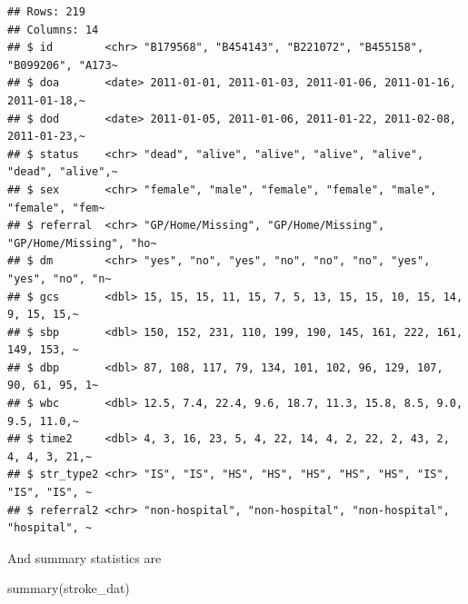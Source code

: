 \documentclass[
]{book}
\makeatletter
\newenvironment{Shaded}{\begin{snugshade}}{\end{snugshade}}
\newcommand{\FunctionTok}[1]{\textcolor[rgb]{0,0,0}{#1}}
\newcommand{\NormalTok}[1]{#1}
\newenvironment{kframe}{%
\medskip{}
\setlength{\fboxsep}{.8em}
 \def\at@end@of@kframe{}%
 \ifinner\ifhmode%
  \def\at@end@of@kframe{\end{minipage}}%
  \begin{minipage}{\columnwidth}%
 \fi\fi%
 \def\FrameCommand##1{\hskip\@totalleftmargin \hskip-\fboxsep
 \colorbox{shadecolor}{##1}\hskip-\fboxsep
     \hskip-\linewidth \hskip-\@totalleftmargin \hskip\columnwidth}%
 \MakeFramed {\advance\hsize-\width
   \@totalleftmargin\z@ \linewidth\hsize
   \@setminipage}}%
 {\par\unskip\endMakeFramed%
 \at@end@of@kframe}
\renewenvironment{Shaded}{\begin{kframe}}{\end{kframe}}
\makeatother
\begin{document}
\begin{verbatim}
## Rows: 219
## Columns: 14
## $ id        <chr> "B179568", "B454143", "B221072", "B455158", "B099206", "A173~
## $ doa       <date> 2011-01-01, 2011-01-03, 2011-01-06, 2011-01-16, 2011-01-18,~
## $ dod       <date> 2011-01-05, 2011-01-06, 2011-01-22, 2011-02-08, 2011-01-23,~
## $ status    <chr> "dead", "alive", "alive", "alive", "alive", "dead", "alive",~
## $ sex       <chr> "female", "male", "female", "female", "male", "female", "fem~
## $ referral  <chr> "GP/Home/Missing", "GP/Home/Missing", "GP/Home/Missing", "ho~
## $ dm        <chr> "yes", "no", "yes", "no", "no", "no", "yes", "yes", "no", "n~
## $ gcs       <dbl> 15, 15, 15, 11, 15, 7, 5, 13, 15, 15, 10, 15, 14, 9, 15, 15,~
## $ sbp       <dbl> 150, 152, 231, 110, 199, 190, 145, 161, 222, 161, 149, 153, ~
## $ dbp       <dbl> 87, 108, 117, 79, 134, 101, 102, 96, 129, 107, 90, 61, 95, 1~
## $ wbc       <dbl> 12.5, 7.4, 22.4, 9.6, 18.7, 11.3, 15.8, 8.5, 9.0, 9.5, 11.0,~
## $ time2     <dbl> 4, 3, 16, 23, 5, 4, 22, 14, 4, 2, 22, 2, 43, 2, 4, 4, 3, 21,~
## $ str_type2 <chr> "IS", "IS", "HS", "HS", "HS", "HS", "HS", "IS", "IS", "IS", ~
## $ referral2 <chr> "non-hospital", "non-hospital", "non-hospital", "hospital", ~
\end{verbatim}

And summary statistics are

\begin{Shaded}
\begin{Highlighting}[]
\FunctionTok{summary}\NormalTok{(stroke\_dat)}
\end{Highlighting}
\end{Shaded}
\end{document}
